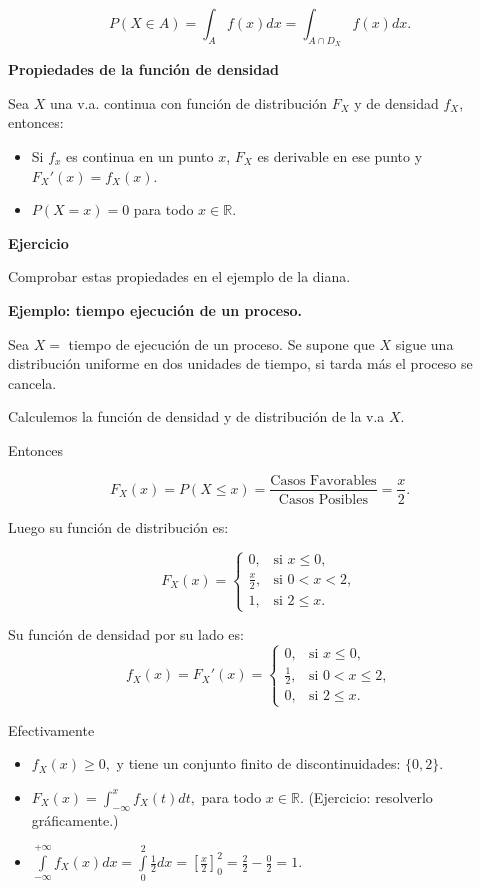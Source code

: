 \documentclass[
  letterpaper,
  DIV=11,
  numbers=noendperiod]{scrreprt}
\providecommand{\tightlist}{%
  \setlength{\itemsep}{0pt}\setlength{\parskip}{0pt}}\usepackage{longtable,booktabs,array}
\begin{document}
\[
P(X\in A)=\displaystyle\int_{A} f(x) dx=\displaystyle\int_{A\cap D_X} f(x) dx.
\]

\textbf{Propiedades de la función de densidad}

Sea \(X\) una v.a. continua con función de distribución \(F_X\) y de
densidad \(f_X\), entonces:

\begin{itemize}
\tightlist
\item
  Si \(f_x\) es continua en un punto \(x\), \(F_X\) es derivable en ese
  punto y \(F_X'(x)=f_X(x).\)
\item
  \(P(X=x)=0\) para todo \(x\in\mathbb{R}.\)
\end{itemize}

\textbf{Ejercicio}

Comprobar estas propiedades en el ejemplo de la diana.

\textbf{Ejemplo: tiempo ejecución de un proceso.}

Sea \(X=\) tiempo de ejecución de un proceso. Se supone que \(X\) sigue
una distribución uniforme en dos unidades de tiempo, si tarda más el
proceso se cancela.

Calculemos la función de densidad y de distribución de la v.a \(X\).

Entonces

\[
F_{X}(x)=P(X\leq x)=\frac{\mbox{Casos Favorables}}{\mbox{Casos Posibles}}=\frac{x}2.
\]

Luego su función de distribución es:

\[
F_{X}(x)=\left\{\begin{array}{ll}
0, & \mbox{si } x\leq 0,\\[1ex]
\frac{x}2, & \mbox{si } 0<x<2,\\[1ex]
1, & \mbox{si } 2\leq x.
\end{array}\right.
\]

Su función de densidad por su lado es: \[
f_{X}(x)=F_{X}'(x)=\left\{\begin{array}{ll}
0, & \mbox{si } x\leq 0,\\[1ex]
\frac12, & \mbox{si } 0<x\leq 2,\\[1ex]
0, & \mbox{si } 2\leq x.
\end{array}\right.
\]

Efectivamente

\begin{itemize}
\item
  \(f_{X}(x)\geq 0,\) y tiene un conjunto finito de discontinuidades:
  \(\{0,2\}\).
\item
  \(F_X(x)=\int_{-\infty}^x f_X(t) dt,\) para todo \(x\in \mathbb{R}\).
  (Ejercicio: resolverlo gráficamente.)
\item
  \(\displaystyle\int\limits_{-\infty}^{+\infty}f_{X}(x)dx=\int\limits_0^2\frac12dx=\left[\frac{x}2\right]_0^2=\frac22-\frac02=1.\)
\end{itemize}
\end{document}

